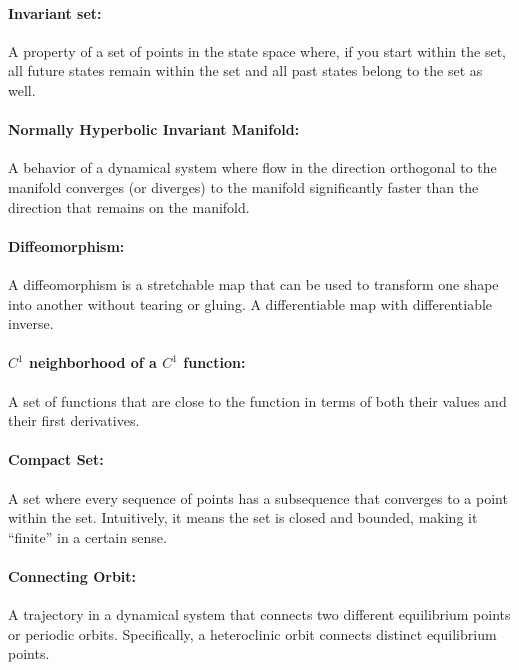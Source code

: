 \documentclass{article} %
\newcommand{\ascomment}[1]{\textcolor{ascolor}{(#1)}}
\newcounter{ct}
\theoremstyle{definition}
\theoremstyle{remark}
\begin{document}
\paragraph{Invariant set:} A property of a set of points in the state space where, if you start within the set, all future states remain within the set and all past states belong to the set as well.\label{sec:supp:invset}
\paragraph{Normally Hyperbolic Invariant Manifold:} A behavior of a dynamical system where flow in the direction orthogonal to the manifold converges (or diverges) to the manifold significantly faster than the direction that remains on the manifold.\label{sec:supp:nhim}
\paragraph{Diffeomorphism:} A diffeomorphism is a stretchable map that can be used to transform one shape into another without tearing or gluing.
A differentiable map with differentiable inverse.\label{sec:supp:diffeomorphism}
\paragraph{\(C^{1}\) neighborhood of a \(C^{1}\) function:} A set of functions that are close to the function in terms of both their values and their first derivatives.\label{sec:supp:c1neighborhood}
\paragraph{Compact Set:} A set where every sequence of points has a subsequence that converges to a point within the set. Intuitively, it means the set is closed and bounded, making it ``finite'' in a certain sense.\label{sec:supp:compactset}
\paragraph{Connecting Orbit:} A trajectory in a dynamical system that connects two different equilibrium points or periodic orbits.
 Specifically, a heteroclinic orbit connects distinct equilibrium points.\label{sec:supp:connectingorbits}

\end{document}
